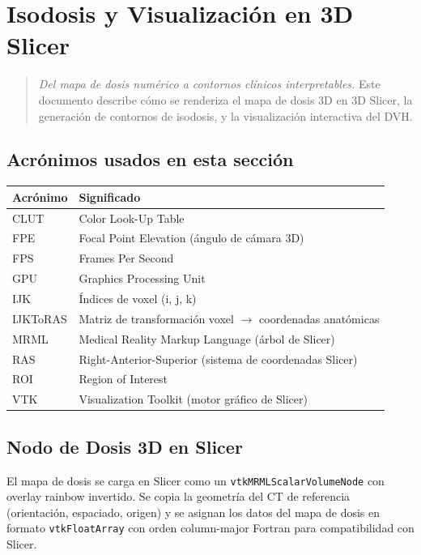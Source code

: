 \documentclass[12pt,a4paper]{article}
\begin{document}
\begin{tcolorbox}[aiSupervisor]
\newpage

\end{tcolorbox}
\section{Isodosis y Visualización en 3D Slicer}

\begin{quote}
\textit{Del mapa de dosis numérico a contornos clínicos interpretables.} Este documento describe cómo se renderiza el mapa de dosis 3D en 3D Slicer, la generación de contornos de isodosis, y la visualización interactiva del DVH.
\end{quote}

\subsection*{Acrónimos usados en esta sección}

\begin{tabular}{p{3cm} p{12cm}}
\toprule
\textbf{Acrónimo} & \textbf{Significado} \\
\midrule
CLUT & Color Look-Up Table \\
FPE & Focal Point Elevation (ángulo de cámara 3D) \\
FPS & Frames Per Second \\
GPU & Graphics Processing Unit \\
IJK & Índices de voxel (i, j, k) \\
IJKToRAS & Matriz de transformación voxel $\to$ coordenadas anatómicas \\
MRML & Medical Reality Markup Language (árbol de Slicer) \\
RAS & Right-Anterior-Superior (sistema de coordenadas Slicer) \\
ROI & Region of Interest \\
VTK & Visualization Toolkit (motor gráfico de Slicer) \\
\bottomrule
\end{tabular}

\subsection{Nodo de Dosis 3D en Slicer}

El mapa de dosis se carga en Slicer como un \texttt{vtkMRMLScalarVolumeNode} con overlay rainbow invertido. Se copia la geometría del CT de referencia (orientación, espaciado, origen) y se asignan los datos del mapa de dosis en formato \texttt{vtkFloatArray} con orden column-major Fortran para compatibilidad con Slicer.
\end{document}
